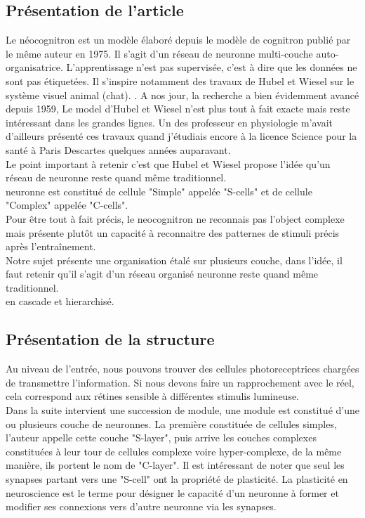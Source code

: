 \documentclass[12pt, letterpaper]{article}
\begin{document}
\subsection{Présentation de l'article}
Le néocognitron est un modèle élaboré depuis le modèle de cognitron publié par le même auteur en 1975. 
Il s'agit d'un réseau de neuronne multi-couche auto-organisatrice. L'apprentissage n'est pas supervisée, c'est à dire que 
les données ne sont pas étiquetées. Il s'inspire notamment des travaux de Hubel et Wiesel sur le système visuel animal (chat).
\autocite{HubelWiesel:2}. A nos jour, la recherche a bien évidemment avancé depuis 1959, Le model d'Hubel et Wiesel n'est plus tout à fait exacte 
mais reste intéressant dans les grandes lignes. Un des professeur en physiologie m'avait d'ailleurs présenté ces travaux quand j'étudiais encore à la 
licence Science pour la santé à Paris Descartes quelques années auparavant. \\
Le point important à retenir c'est que Hubel et Wiesel propose l'idée qu'un réseau de neuronne 
reste quand même traditionnel.\\
 neuronne est 
constitué de cellule "Simple" appelée "S-cells" et de cellule "Complex" appelée "C-cells".\\
Pour être tout à fait précis, le neocognitron ne reconnais pas l'object complexe mais présente plutôt un 
capacité à reconnaitre des patternes de stimuli précis après l'entraînement.\\
Notre sujet présente une organisation étalé sur plusieurs couche, dans l'idée, il faut retenir qu'il s'agit d'un réseau organisé neuronne 
reste quand même traditionnel.\\
 en cascade et hierarchisé.

\subsection{Présentation de la structure}
Au niveau de l'entrée, nous pouvons trouver des cellules photoreceptrices chargées de transmettre l'information. Si nous devons faire un rapprochement avec le réel, cela correspond aux rétines sensible à différentes stimulis lumineuse.\\
Dans la suite intervient une succession de module, une module est constitué d'une ou plusieurs couche de neuronnes.
La première constituée de cellules simples, l'auteur appelle cette couche "S-layer", puis arrive les couches complexes constituées 
à leur tour de cellules complexe voire hyper-complexe, de la même manière, ils portent le nom de "C-layer".
Il est intéressant de noter que seul les synapses partant vers une "S-cell" ont la propriété de plasticité. La plasticité en neuroscience 
est le terme pour désigner le capacité d'un neuronne à former et modifier ses connexions vers d'autre neuronne via les synapses. 
\end{document}

